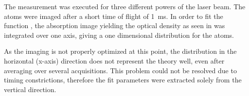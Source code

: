 
The measurement was executed for three different powers of the laser beam. The atoms were imaged after a short time of flight of \SI{1}{\milli\second}. In order to fit the function , the absorption image yielding the optical density as seen in  was integrated over one axis, giving a one dimensional distribution for the atoms.

As the imaging is not properly optimized at this point, the distribution in the horizontal (x-axis) direction does not represent the theory well, even after averaging over several acquisitions. This problem could not be resolved due to timing constrictions, therefore the fit parameters were extracted solely from the vertical direction.

